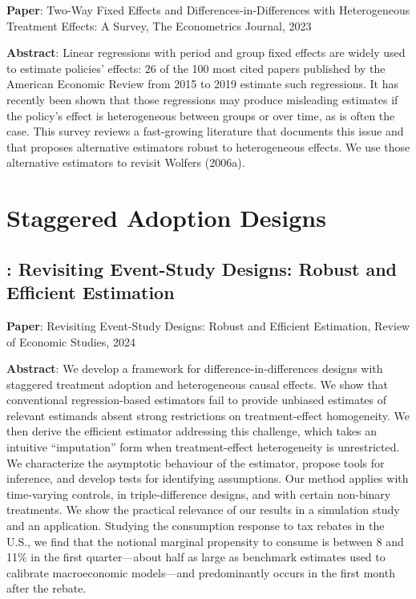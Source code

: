\documentclass[12pt]{article}
\theoremstyle{definition}
\begin{document}
{\bf Paper}: Two-Way Fixed Effects and Differences-in-Differences with Heterogeneous Treatment Effects: A Survey, The Econometrics Journal, 2023

{\bf Abstract}: Linear regressions with period and group fixed effects are widely used to estimate policies' effects: 26 of the 100 most cited papers published by the American Economic Review from 2015 to 2019 estimate such regressions. It has recently been shown that those regressions may produce misleading estimates if the policy's effect is heterogeneous between groups or over time, as is often the case. This survey reviews a fast-growing literature that documents this issue and that proposes alternative estimators robust to heterogeneous effects. We use those alternative estimators to revisit Wolfers (2006a).

\section{Staggered Adoption Designs}

\subsection{\citet{borusyakRevisitingEventStudyDesigns2024}: Revisiting Event-Study Designs: Robust and Efficient Estimation}

{\bf Paper}: Revisiting Event-Study Designs: Robust and Efficient Estimation, Review of Economic Studies, 2024

{\bf Abstract}: We develop a framework for difference-in-differences designs with staggered treatment adoption and heterogeneous causal effects. We show that conventional regression-based estimators fail to provide unbiased estimates of relevant estimands absent strong restrictions on treatment-effect homogeneity. We then derive the efficient estimator addressing this challenge, which takes an intuitive “imputation” form when treatment-effect heterogeneity is unrestricted. We characterize the asymptotic behaviour of the estimator, propose tools for inference, and develop tests for identifying assumptions. Our method applies with time-varying controls, in triple-difference designs, and with certain non-binary treatments. We show the practical relevance of our results in a simulation study and an application. Studying the consumption response to tax rebates in the U.S., we find that the notional marginal propensity to consume is between 8 and 11\% in the first quarter—about half as large as benchmark estimates used to calibrate macroeconomic models—and predominantly occurs in the first month after the rebate.
\end{document}
